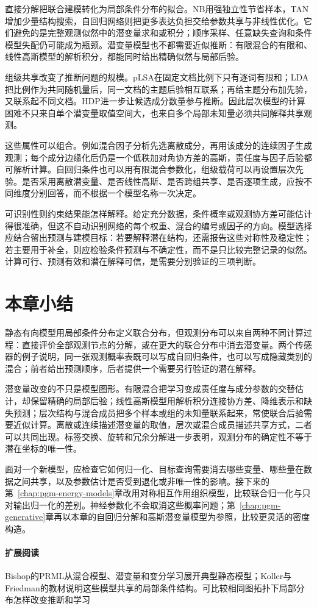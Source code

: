 直接分解把联合建模转化为局部条件分布的拟合。NB用强独立性节省样本，TAN增加少量结构搜索，自回归网络则把更多表达负担交给参数共享与非线性优化。它们避免的是完整观测似然中的潜变量求和或积分；顺序采样、任意缺失查询和条件模型失配仍可能成为瓶颈。潜变量模型也不都需要近似推断：有限混合的有限和、线性高斯模型的解析积分，都能同时给出精确似然与局部后验。

组级共享改变了推断问题的规模。pLSA在固定文档比例下只有逐词有限和；LDA把比例作为共同随机量后，同一文档的主题后验相互联系；再给主题分布加先验，又联系起不同文档。HDP进一步让候选成分数量参与推断。因此层次模型的计算困难不只来自单个潜变量取值空间大，也来自多个局部未知量必须共同解释共享观测。

这些属性可以组合。例如混合因子分析先选离散成分，再用该成分的连续因子生成观测；每个成分边缘化后仍是一个低秩加对角协方差的高斯，责任度与因子后验都可解析计算。自回归条件也可以用有限混合参数化，组级载荷可以再设置层次先验。是否采用离散潜变量、是否线性高斯、是否跨组共享、是否逐项生成，应按不同维度分别回答，而不根据一个模型名称一次决定。

可识别性则约束结果能怎样解释。给定充分数据，条件概率或观测协方差可能估计得很准确，但这不自动识别网络的每个权重、混合的编号或因子的方向。模型选择应结合留出预测与建模目标：若要解释潜在结构，还需报告这些对称性及稳定性；若主要用于补全，则应检验条件预测与不确定性，而不是只比较完整记录的似然。计算可行、预测有效和潜在解释可信，是需要分别验证的三项判断。

\section{本章小结}
\label{sec:pgm-static-directed-summary}

静态有向模型用局部条件分布定义联合分布，但观测分布可以来自两种不同计算过程：直接评价全部观测节点的分解，或在更大的联合分布中消去潜变量。两个传感器的例子说明，同一张观测概率表既可以写成自回归条件，也可以写成隐藏类别的混合；前者给出预测顺序，后者提供一个需要另行验证的潜在解释。

潜变量改变的不只是模型图形。有限混合把学习变成责任度与成分参数的交替估计，却保留精确的局部后验；线性高斯模型用解析积分连接协方差、降维表示和缺失预测；层次结构与混合成员把多个样本或组的未知量联系起来，常使联合后验需要近似计算。离散或连续描述潜变量的取值，层次或混合成员描述共享方式，二者可以共同出现。标签交换、旋转和冗余分解进一步表明，观测分布的确定性不等于潜在坐标的唯一性。

面对一个新模型，应检查它如何归一化、目标查询需要消去哪些变量、哪些量在数据之间共享，以及参数估计是否受到退化或非唯一性的影响。接下来的第~\ref{chap:pgm-energy-models}章改用对称相互作用组织模型，比较联合归一化与只对输出归一化的差别。神经参数化不会取消这些概率问题；第~\ref{chap:pgm-generative}章再以本章的自回归分解和高斯潜变量模型为参照，比较更灵活的密度构造。

\paragraph{扩展阅读}
Bishop的PRML从混合模型、潜变量和变分学习展开典型静态模型；Koller与Friedman的教材说明这些模型共享的局部条件结构。可比较相同图拓扑下局部分布怎样改变推断和学习
